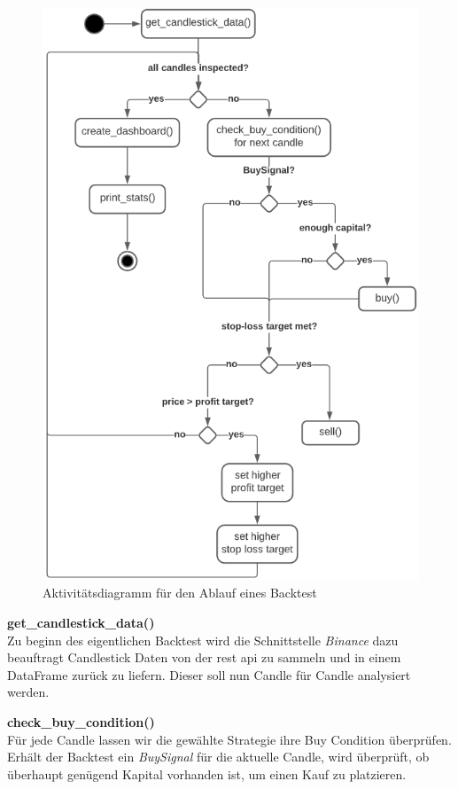 \documentclass[oneside]{ausarbeitung}
\begin{document}
\begin{figure}[H]
  \centering
  \includegraphics[height=1\textheight]{uml/backtest_activity_uml.png}
  \caption{Aktivitätsdiagramm für den Ablauf eines Backtest}
  \label{fig:13}
\end{figure}

\textbf{get\_candlestick\_data()} \\
Zu beginn des eigentlichen Backtest wird die Schnittstelle \textit{Binance} dazu beauftragt Candlestick Daten von der \ac{rest} \ac{api} zu sammeln und in einem DataFrame zurück zu liefern. Dieser soll nun Candle für Candle analysiert werden.

\textbf{check\_buy\_condition()} \\
Für jede Candle lassen wir die gewählte Strategie ihre Buy Condition überprüfen. Erhält der Backtest ein \textit{BuySignal} für die aktuelle Candle, wird überprüft, ob überhaupt genügend Kapital vorhanden ist, um einen Kauf zu platzieren.
\end{document}
